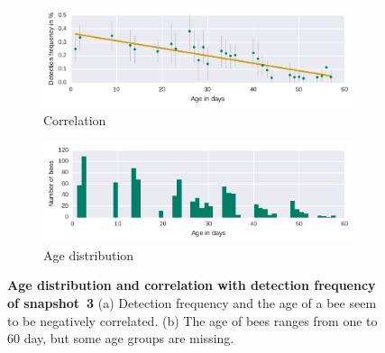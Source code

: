 \begin{figure}[bp]
	\centering
	\begin{subfigure}[b]{1\textwidth}
	\centering
	\includegraphics[width=1.0\textwidth]{Figures/n3_detFvsAge}
	\caption[Correlation]{Correlation}
	\label{fig:n3detfVSage}
	\end{subfigure} 
	\begin{subfigure}[b]{1\textwidth}
	\centering
	\includegraphics[width=1.0\textwidth]{Figures/n3_ages.pdf}
	\caption[Age distribution]{Age distribution}
	\label{fig:n3ageDist}
	\end{subfigure}
	\caption[Age distribution and correlation with detection frequency of snapshot~3]{\textbf{Age distribution and correlation with detection frequency of snapshot~3} (a) Detection frequency and the age of a bee seem to be negatively correlated. (b) The age of bees ranges from one to 60 day, but some age groups are missing.}
	\label{fig:ageDetF}
\end{figure}

